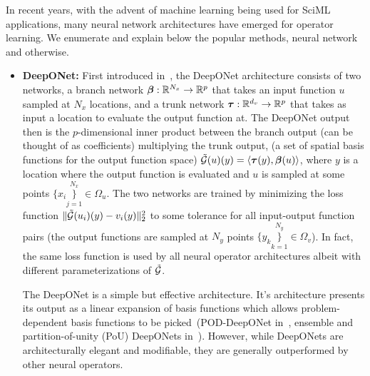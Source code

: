 In recent years, with the advent of machine learning being used for SciML applications, many neural network architectures have emerged for operator learning. We enumerate and explain below the popular methods, neural network and otherwise.
\begin{itemize}
\item {\bf DeepONet:} First introduced in~\citep{lu2019deeponet}, the DeepONet architecture consists of two networks, a branch network $\boldsymbol{\beta}: \mathbb{R}^{N_x} \rightarrow \mathbb{R}^p$ that takes an input function $u$ sampled at $N_x$ locations, and a trunk network $\boldsymbol{\tau}: \mathbb{R}^{d_v} \rightarrow \mathbb{R}^p$ that takes as input a location to evaluate the output function at. The DeepONet output then is the $p$-dimensional inner product between the branch output (can be thought of as coefficients) multiplying the trunk output, (a set of spatial basis functions for the output function space) $\tilde{\mathcal{G}}(u)(y) = \langle \boldsymbol{\tau}(y), \boldsymbol{\beta}(u) \rangle$, where $y$ is a location where the output function is evaluated and $u$ is sampled at some points $\{x_i\}\limits_{j=1}^{N_x} \in \Omega_u$. The two networks are trained by minimizing the loss function $\|\tilde{\mathcal{G}}(u_i)(y) - v_i(y) \|_2^2$ to some tolerance for all input-output function pairs (the output functions are sampled at $N_y$ points $\{y_k\}\limits_{k=1}^{N_y} \in \Omega_v$). In fact, the same loss function is used by all neural operator architectures albeit with different parameterizations of $\tilde{\mathcal{G}}$.

The DeepONet is a simple but effective architecture. It's architecture presents its output as a linear expansion of basis functions which allows problem-dependent basis functions to be picked~(POD-DeepONet in~\citep{lu2022comprehensive}, ensemble and partition-of-unity (PoU) DeepONets in~\citep{sharma2024ensemble}). However, while DeepONets are architecturally elegant and modifiable, they are generally outperformed by other neural operators.


\end{itemize}
